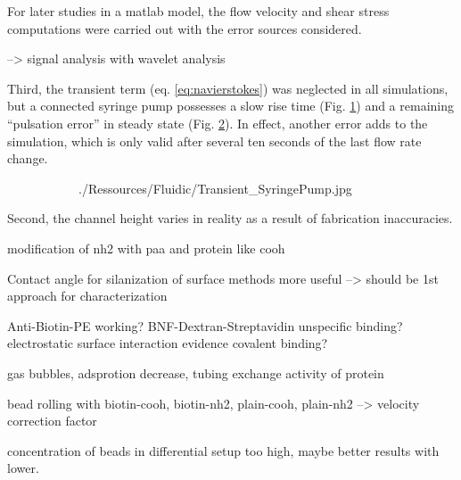 For later studies in a matlab model, the flow velocity and shear stress computations were carried out with the error sources considered. 


--> signal analysis with wavelet analysis

Third, the transient term (eq. \ref{eq:navierstokes}) was neglected in all simulations, but a connected syringe pump possesses a slow rise time (Fig. \ref{fig:fluidic:pumpStability:transient}) and a remaining ``pulsation error'' in steady state (Fig. \ref{fig:fluidic:pumpStability:steadystate}). In effect, another error adds to the simulation, which is only valid after several ten seconds of the last flow rate change.
\begin{figure}
	\begin{subfigure}[b]{0.5\textwidth}
		\centering
		\addtocounter{subfigure}{1}  
		 {./Ressources/Fluidic/Transient_SyringePump.jpg}		
		\addtocounter{subfigure}{-1}  
		\label{fig:fluidic:pumpStability:transient}
	\end{subfigure}%
	\begin{subfigure}[b]{0.5\textwidth}
		\centering
		\addtocounter{subfigure}{1}  
		\addtocounter{subfigure}{-1}  
		\label{fig:fluidic:pumpStability:steadystate}
	\end{subfigure}
	\label{fig:fluidic:pumpStability}
\end{figure}


Second, the channel height varies in reality as a result of fabrication inaccuracies. 

modification of nh2 with paa and protein like cooh

Contact angle for silanization of surface methods more useful --> should be 1st approach for characterization

Anti-Biotin-PE working?
BNF-Dextran-Streptavidin unspecific binding?
electrostatic surface interaction
evidence covalent binding?

gas bubbles, adsprotion decrease, tubing exchange
activity of protein

bead rolling with biotin-cooh, biotin-nh2, plain-cooh, plain-nh2 --> velocity correction factor

concentration of beads in differential setup too high, maybe better results with lower.